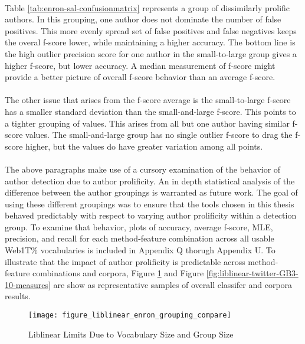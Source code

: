 	\paragraph*{} Table \ref{tab:enron-sal-confusionmatrix} represents a group of dissimilarly prolific authors.  In this grouping, one author does not dominate the number of false positives.  This more evenly spread set of false positives and false negatives keeps the overal f-score lower, while maintaining a higher accuracy.  The bottom line is the high outlier precision score for one author in the small-to-large group gives a higher f-score, but lower accuracy.  A median measurement of f-score might provide a better picture of overall f-score behavior than an average f-score.
	\paragraph*{} The other issue that arises from the f-score average is the small-to-large f-score has a smaller standard deviation than the small-and-large f-score.  This points to a tighter grouping of values.  This arises from all but one author having similar f-score values.  The small-and-large group has no single outlier f-score to drag the f-score higher, but the values do have greater variation among all points.
	\paragraph*{}The above paragraphs make use of a cursory examination of the behavior of author detection due to author prolificity.  An in depth statistical analysis of the difference between the author groupings is warranted as future work.  The goal of using these different groupings was to ensure that the tools chosen in this thesis behaved predictably with respect to varying author prolificity within a detection group.  To examine that behavior, plots of accuracy, average f-score, MLE, precision, and recall for each method-feature combination across all usable Web1T\% vocabularies is included in Appendix Q thorugh Appendix U.  To illustrate that the impact of author prolificity is predictable across method-feature combinations and corpora, Figure \ref{fig:liblinear-enron-GB3-10-measures} and Figure \ref{fig:liblinear-twitter-GB3-10-measures} are show as representative samples of overall classifer and corpora results.
	
\begin{figure}[htbp!]
	\begin{center}
	\centering
	\texttt{[image: figure\_liblinear\_enron\_grouping\_compare]}
	\caption{Liblinear Limits Due to Vocabulary Size and Group Size}
	\label{fig:liblinear-enron-GB3-10-measures}
	\end{center}
\end{figure}

